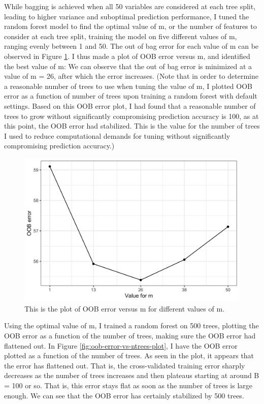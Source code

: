 \documentclass[
]{article}
\begin{document}
While bagging is achieved when all 50 variables are considered at each tree split, leading to higher variance and suboptimal prediction performance, I tuned the random forest model to find the optimal value of m, or the number of features to consider at each tree split, training the model on five different values of m, ranging evenly between 1 and 50. The out of bag error for each value of m can be observed in Figure \ref{fig:oob-error-vs-m-plot}. I thus made a plot of OOB error versus m, and identified the best value of m: We can observe that the out of bag error is minimized at a value of m = 26, after which the error increases. (Note that in order to determine a reasonable number of trees to use when tuning the value of m, I plotted OOB error as a function of number of trees upon training a random forest with default settings. Based on this OOB error plot, I had found that a reasonable number of trees to grow without significantly compromising prediction accuracy is 100, as at this point, the OOB error had stabilized. This is the value for the number of trees I used to reduce computational demands for tuning without significantly compromising prediction accuracy.)

\begin{figure}[H]

{\centering \includegraphics[width=0.65\linewidth]{../results/oob-error-vs-m-plot} 

}

\caption{This is the plot of OOB error versus m for different values of m.}\label{fig:oob-error-vs-m-plot}
\end{figure}

Using the optimal value of m, I trained a random forest on 500 trees, plotting the OOB error as a function of the number of trees, making sure the OOB error had flattened out. In Figure \ref{fig:oob-error-vs-ntrees-plot}, I have the OOB error plotted as a function of the number of trees. As seen in the plot, it appears that the error has flattened out. That is, the cross-validated training error sharply decreases as the number of trees increases and then plateaus starting at around B = 100 or so. That is, this error stays flat as soon as the number of trees is large enough. We can see that the OOB error has certainly stabilized by 500 trees.
\end{document}
